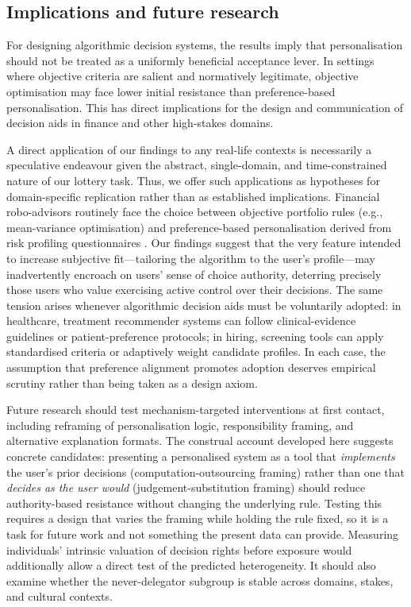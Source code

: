 \documentclass[a4paper, 12pt, fleqn]{article}
\theoremstyle{hypstyle}
\begin{document}
\subsection{Implications and future research}
For designing algorithmic decision systems, the results imply that personalisation should not be treated as a uniformly beneficial acceptance lever. In settings where objective criteria are salient and normatively legitimate, objective optimisation may face lower initial resistance than preference-based personalisation. This has direct implications for the design and communication of decision aids in finance and other high-stakes domains.

A direct application of our findings to any real-life contexts is necessarily a speculative endeavour given the abstract, single-domain, and time-constrained nature of our lottery task. Thus, we offer such applications as hypotheses for domain-specific replication rather than as established implications. Financial robo-advisors routinely face the choice between objective portfolio rules (e.g., mean-variance optimisation) and preference-based personalisation derived from risk profiling questionnaires \citep{Capponi2022,Ruehr2020}. Our findings suggest that the very feature intended to increase subjective fit---tailoring the algorithm to the user's profile---may inadvertently encroach on users' sense of choice authority, deterring precisely those users who value exercising active control over their decisions. The same tension arises whenever algorithmic decision aids must be voluntarily adopted: in healthcare, treatment recommender systems can follow clinical-evidence guidelines or patient-preference protocols; in hiring, screening tools can apply standardised criteria or adaptively weight candidate profiles. In each case, the assumption that preference alignment promotes adoption deserves empirical scrutiny rather than being taken as a design axiom.

Future research should test mechanism-targeted interventions at first contact, including reframing of personalisation logic, responsibility framing, and alternative explanation formats. The construal account developed here suggests concrete candidates: presenting a personalised system as a tool that \emph{implements} the user's prior decisions (computation-outsourcing framing) rather than one that \emph{decides as the user would} (judgement-substitution framing) should reduce authority-based resistance without changing the underlying rule. Testing this requires a design that varies the framing while holding the rule fixed, so it is a task for future work and not something the present data can provide. Measuring individuals' intrinsic valuation of decision rights \citep{Bartling2014,Owens2014} before exposure would additionally allow a direct test of the predicted heterogeneity. It should also examine whether the never-delegator subgroup is stable across domains, stakes, and cultural contexts.
\end{document}
